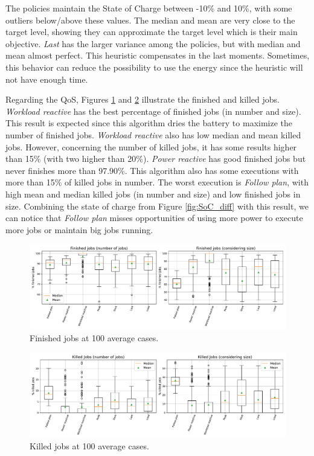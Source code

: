 The policies maintain the State of Charge between -10\% and 10\%, with some outliers below/above these values. The median and mean are very close to the target level, showing they can approximate the target level which is their main objective. \emph{Last} has the larger variance among the policies, but with median and mean almost perfect. This heuristic compensates in the last moments. Sometimes, this behavior can reduce the possibility to use the energy since the heuristic will not have enough time. 

Regarding the QoS, Figures \ref{fig:finished_diff} and \ref{fig:killed_diff} illustrate the finished and killed jobs. \emph{Workload reactive} has the best percentage of finished jobs (in number and size). This result is expected since this algorithm dries the battery to maximize the number of finished jobs. \emph{Workload reactive} also has low median and mean killed jobs. However, concerning the number of killed jobs, it has some results higher than 15\% (with two higher than 20\%). \emph{Power reactive} has good finished jobs but never finishes more than 97.90\%. This algorithm also has some executions with more than 15\% of killed jobs in number. The worst execution is \emph{Follow plan}, with high mean and median killed jobs (in number and size) and low finished jobs in size. Combining the state of charge from Figure \ref{fig:SoC_diff} with this result, we can notice that \emph{Follow plan} misses opportunities of using more power to execute more jobs or maintain big jobs running.

\begin{figure}[!htb]
    \centering
    \includegraphics[scale=0.38]{Images/Compensations/finished_diff.pdf}
    \caption{Finished jobs at 100 average cases.}
    \label{fig:finished_diff}
\end{figure}

\begin{figure}[!htb]
    \centering
    \includegraphics[scale=0.38]{Images/Compensations/killed_diff.pdf}
    \caption{Killed jobs at 100 average cases.}
    \label{fig:killed_diff}
\end{figure}

